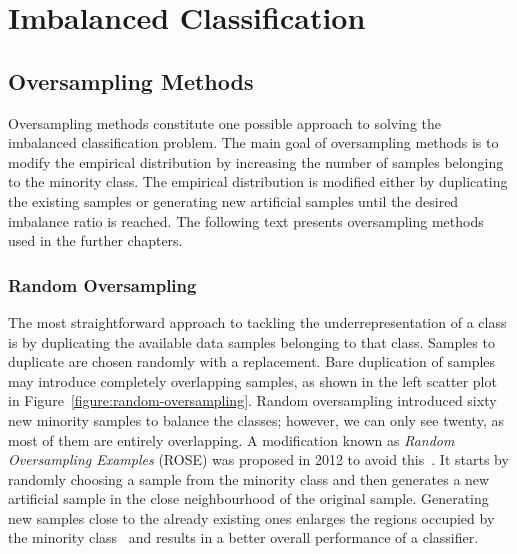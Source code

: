\chapter{Imbalanced Classification}
\label{chapter:imb-classif}


\section{Oversampling Methods}
\label{section:oversampling-methods}

Oversampling methods constitute one possible approach to solving the imbalanced classification
problem. The main goal of oversampling methods is to modify the empirical distribution by
increasing the number of samples belonging to the minority class. The empirical distribution is
modified either by duplicating the existing samples or generating new artificial samples until the
desired imbalance ratio is reached. The following text presents oversampling methods used in the
further chapters.


\subsection{Random Oversampling}
\label{subsection:random-oversampling}

The most straightforward approach to tackling the underrepresentation of a class is by duplicating
the available data samples belonging to that class. Samples to duplicate are chosen randomly with a
replacement. Bare duplication of samples may introduce completely overlapping samples, as shown in
the left scatter plot in Figure~\ref{figure:random-oversampling}. Random oversampling introduced
sixty new minority samples to balance the classes; however, we can only see twenty, as most of them
are entirely overlapping. A modification known as \textit{Random Oversampling Examples} (ROSE) was
proposed in 2012 to avoid this~\cite{rose}. It starts by randomly choosing a sample from the
minority class and then generates a new artificial sample in the close neighbourhood of the
original sample. Generating new samples close to the already existing ones enlarges the regions
occupied by the minority class~\cite{smote} and results in a better overall performance of a
classifier.

